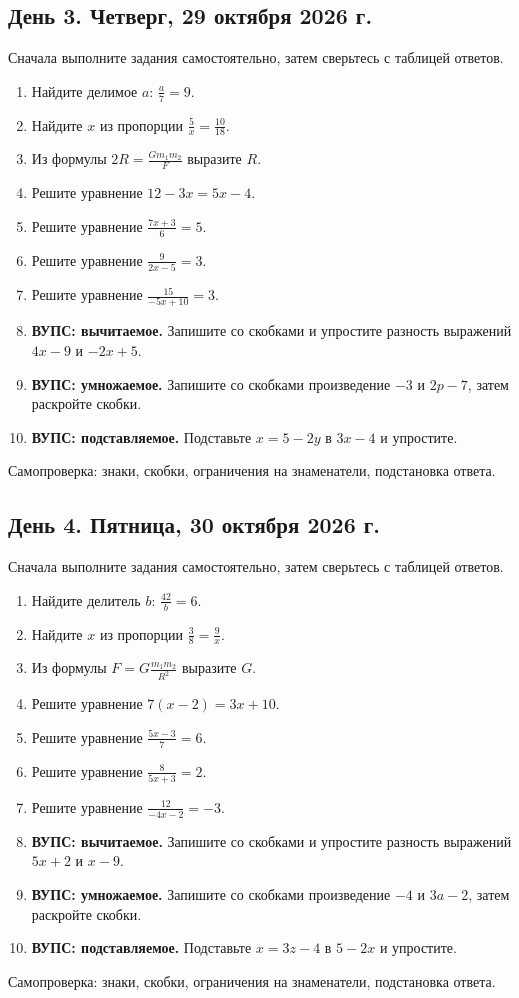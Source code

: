 \documentclass[a4paper,12pt]{article}
\begin{document}
\subsection*{День 3. Четверг, 29 октября 2026 г.}
\textcolor{muted}{Сначала выполните задания самостоятельно, затем сверьтесь с таблицей ответов.}
\begin{enumerate}[label=\arabic*.,leftmargin=1.8em,itemsep=11pt,topsep=7pt]
\item Найдите делимое $a$: $\displaystyle\frac a7=9$.
\item Найдите $x$ из пропорции $\displaystyle\frac5x=\frac{10}{18}$.
\item Из формулы $\displaystyle 2R=\frac{Gm_1m_2}{F}$ выразите $R$.
\item Решите уравнение $12-3x=5x-4$.
\item Решите уравнение $\displaystyle\frac{7x+3}{6}=5$.
\item Решите уравнение $\displaystyle\frac9{2x-5}=3$.
\item Решите уравнение $\displaystyle\frac{15}{-5x+10}=3$.
\item \textbf{ВУПС: вычитаемое.} Запишите со скобками и упростите разность выражений $4x-9$ и $-2x+5$.
\item \textbf{ВУПС: умножаемое.} Запишите со скобками произведение $-3$ и $2p-7$, затем раскройте скобки.
\item \textbf{ВУПС: подставляемое.} Подставьте $x=5-2y$ в $3x-4$ и упростите.
\end{enumerate}
\vfill\small\textcolor{muted}{Самопроверка: знаки, скобки, ограничения на знаменатели, подстановка ответа.}\normalsize
\clearpage
\subsection*{День 4. Пятница, 30 октября 2026 г.}
\textcolor{muted}{Сначала выполните задания самостоятельно, затем сверьтесь с таблицей ответов.}
\begin{enumerate}[label=\arabic*.,leftmargin=1.8em,itemsep=11pt,topsep=7pt]
\item Найдите делитель $b$: $\displaystyle\frac{42}{b}=6$.
\item Найдите $x$ из пропорции $\displaystyle\frac38=\frac9x$.
\item Из формулы $\displaystyle F=G\frac{m_1m_2}{R^2}$ выразите $G$.
\item Решите уравнение $7(x-2)=3x+10$.
\item Решите уравнение $\displaystyle\frac{5x-3}{7}=6$.
\item Решите уравнение $\displaystyle\frac8{5x+3}=2$.
\item Решите уравнение $\displaystyle\frac{12}{-4x-2}=-3$.
\item \textbf{ВУПС: вычитаемое.} Запишите со скобками и упростите разность выражений $5x+2$ и $x-9$.
\item \textbf{ВУПС: умножаемое.} Запишите со скобками произведение $-4$ и $3a-2$, затем раскройте скобки.
\item \textbf{ВУПС: подставляемое.} Подставьте $x=3z-4$ в $5-2x$ и упростите.
\end{enumerate}
\vfill\small\textcolor{muted}{Самопроверка: знаки, скобки, ограничения на знаменатели, подстановка ответа.}\normalsize
\clearpage
\end{document}
